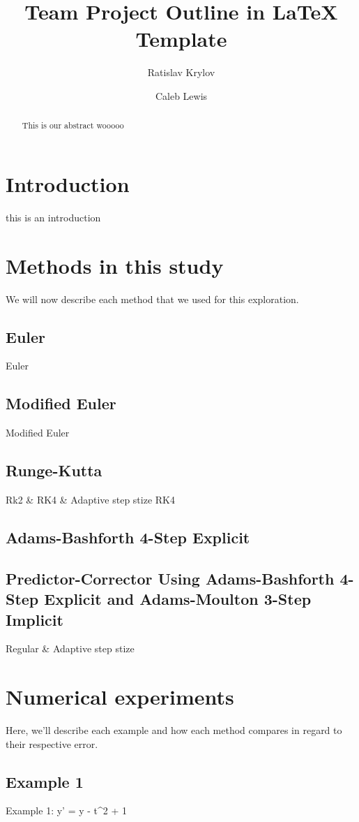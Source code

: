 \documentclass[11pt]{article}
\title{Team Project Outline in LaTeX Template}
\author{Ratislav Krylov \and Caleb Lewis}
\begin{document}
\maketitle

\begin{abstract}
This is our abstract wooooo
\end{abstract}

\section{Introduction}
this is an introduction

\section{Methods in this study}
We will now describe each method that we used for this exploration.

\subsection{Euler}
Euler

\subsection{Modified Euler}
Modified Euler

\subsection{Runge-Kutta}
Rk2 & RK4 & Adaptive step stize RK4

\subsection{Adams-Bashforth 4-Step Explicit}


\subsection{Predictor-Corrector Using Adams-Bashforth 4-Step Explicit and Adams-Moulton 3-Step Implicit}
Regular & Adaptive step stize

\section{Numerical experiments}
Here, we'll describe each example and how each method compares in regard to their respective error.

\subsection{Example 1}
Example 1: y' = y - t^2 + 1
\end{document}
